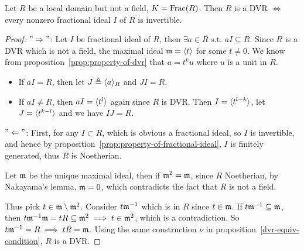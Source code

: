 \begin{prop} \label{prop:equvalence-of-dvr-with-fractional-ideal}
    Let $R$ be a local domain but not a field, $K = \operatorname{Frac}(R)$.
      Then $R$ is a DVR $\iff$ every nonzero fractional ideal $I$ of $R$ is
      invertible.
      \begin{proof}
        $"\Rightarrow"$:
        Let $I$ be fractional ideal of $R$,
        then $\exists a \in R \text{ s.t. } aI \subseteq R$.
        Since $R$ is a DVR which is not a field,
        the maximal ideal $\mathfrak{m} = \langle t\rangle$ for some $t \ne 0$.
        We know from proposition~\ref{prop:property-of-dvr}
        that $a = t^k u$ where $u$ is a unit in $R$.
        \begin{itemize}
          \item If $aI = R$, then let $J \triangleq \langle a\rangle_R$ and $JI = R$.
          \item If $aI \ne R$, then $aI = \langle t^l\rangle$ again since $R$
            is DVR. Then $I = \langle t^{l-k}\rangle$, let $J = \langle t^{k-l}\rangle$
            and we have $IJ = R$.
        \end{itemize}

        $"\Leftarrow"$:
        First, for any $I \subset R$, which is obvious a fractional ideal,
        so $I$ is invertible, and hence by proposition~\ref{prop:property-of-fractional-ideal},
        $I$ is finitely generated, thus $R$ is Noetherian.

        Let $\mathfrak{m}$ be the unique maximal ideal, then if $\mathfrak{m}^2 = \mathfrak{m}$,
        since $R$ Noetherian, by Nakayama's lemma, $\mathfrak{m} = 0$,
        which contradicts the fact that $R$ is not a field.

        Thus pick $t \in \mathfrak{m} \setminus \mathfrak{m}^2$. Consider $t \mathfrak{m}^{-1}$
        which is in $R$ since $t \in \mathfrak{m}$.
        If $t \mathfrak{m}^{-1} \subseteq \mathfrak{m}$, then $t \mathfrak{m}^{-1} \mathfrak{m} = t R \subseteq \mathfrak{m}^2 \implies
        t \in \mathfrak{m}^2$, which is a contradiction. So $t \mathfrak{m}^{-1} = R \implies tR = \mathfrak{m}$.
        Using the same construction $\nu$ in proposition~\ref{dvr-equiv-condition},
        $R$ is a DVR.
      \end{proof}
\end{prop}

